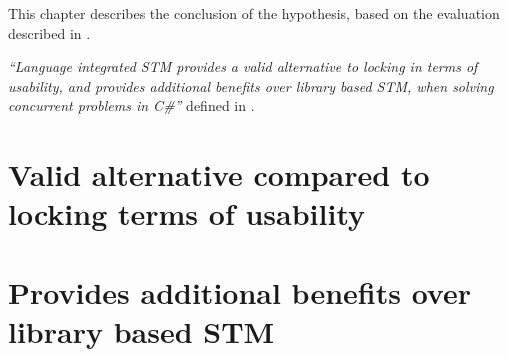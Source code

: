\makeatletter {}\makeatother
{}
This chapter describes the conclusion of the hypothesis, based on the evaluation described in . 
\label{chap:conclusion}

\textit{``Language integrated \ac{STM} provides a valid alternative to locking in terms of usability, and provides additional benefits over library based \ac{STM}, when solving concurrent problems in C\#''} defined in .


\section{Valid alternative compared to locking terms of usability}







\section{Provides additional benefits over library based STM}


% 



\worksheetend